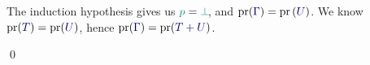 \begin{case*}
  The induction hypothesis gives us $\cs{p}=\cs{\pbot}$, and $\pr(\ty{\Gamma})=\pr{(\ty{U})}$. We know $\pr(\ty{T})=\pr({\ty{U}})$, hence $\pr(\ty{\Gamma})=\pr(\ty{\tysum{T}{U}})$.
  \begin{mathpar}
  \end{mathpar}
\end{case*}
\qed

